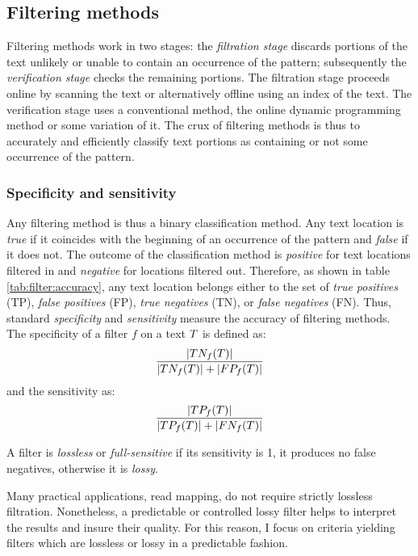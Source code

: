 
\subsection{Filtering methods}
\label{sec:intro:filtering}

Filtering methods work in two stages: the \emph{filtration stage} discards portions of the text unlikely or unable to contain an occurrence of the pattern; subsequently the \emph{verification stage} checks the remaining portions.
The filtration stage proceeds online by scanning the text or alternatively offline using an index of the text.
The verification stage uses a conventional method, \eg the online dynamic programming method or some variation of it.
The crux of filtering methods is thus to accurately and efficiently classify text portions as containing or not some occurrence of the pattern.

\subsubsection{Specificity and sensitivity}
\label{intro:filtering:spec-sens}

Any filtering method is thus a binary classification method.
Any text location is \emph{true} if it coincides with the beginning of an occurrence of the pattern and \emph{false} if it does not.
The outcome of the classification method is \emph{positive} for text locations filtered in and \emph{negative} for locations filtered out.
Therefore, as shown in table \ref{tab:filter:accuracy}, any text location belongs either to the set of \emph{true positives} (TP), \emph{false positives} (FP), \emph{true negatives} (TN), or \emph{false negatives} (FN).
Thus, standard \emph{specificity} and \emph{sensitivity} measure the accuracy of filtering methods.
The specificity of a filter $f$ on a text $T$ is defined as:
\begin{eqnarray}
\frac{|TN_f(T)|}{|TN_f(T)| + |FP_f(T)|}
\end{eqnarray}
and the sensitivity as:
\begin{eqnarray}
\frac{|TP_f(T)|}{|TP_f(T)| + |FN_f(T)|}
\end{eqnarray}

\begin{definition}
A filter is \emph{lossless} or \emph{full-sensitive} if its sensitivity is 1, \ie it produces no false negatives, otherwise it is \emph{lossy}.
\end{definition}
Many practical applications, \eg read mapping, do not require strictly lossless filtration.
Nonetheless, a predictable or controlled lossy filter helps to interpret the results and insure their quality.
For this reason, I focus on criteria yielding filters which are lossless or lossy in a predictable fashion.


